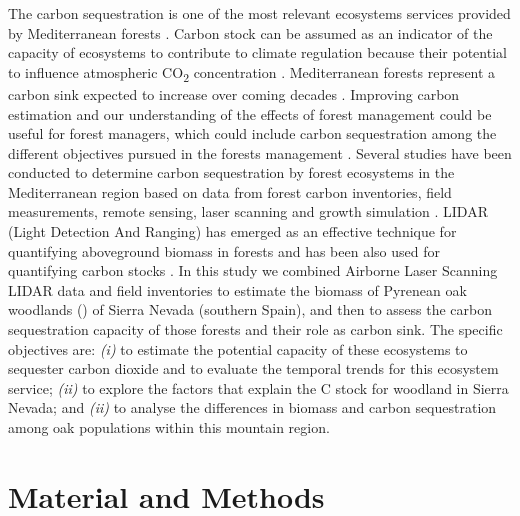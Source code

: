 The carbon sequestration is one of the most relevant ecosystems services provided by Mediterranean forests \autocite{Gauquelinetal2018MediterraneanForests,NoceSantini2018MediterraneanForest}. Carbon stock can be assumed as an indicator of the capacity of ecosystems to contribute to climate regulation because their potential to influence atmospheric CO\textsubscript{2} concentration \autocite{Lauterbach2007AssessmentExisting,Luyssaertetal2008OldgrowthForests}. Mediterranean forests represent a carbon sink expected to increase over coming decades \autocite{Canellasetal2017CarbonSequestration,PasalodosTatoetal2017EvaluationTree}. Improving carbon estimation and our understanding of the effects of forest management could be useful for forest managers, which could include carbon sequestration among the different objectives pursued in the forests management \autocite{RuizPeinadoetal2017ForestManagement}. Several studies have been conducted to determine carbon sequestration by forest ecosystems in the Mediterranean region based on data from forest carbon inventories, field measurements, remote sensing, laser scanning and growth simulation \autocites[\emph{e.g.}][]{Canellasetal2008SilvicultureCarbon,Chiesietal2005ModellingCarbon,Garciaetal2010EstimatingBiomass,GuerraHernandezetal2016ComparisonALS,Simonsonetal2016ModellingAboveground,Vayredaetal2012SpatialPatterns}. LIDAR (Light Detection And Ranging) has emerged as an effective technique for quantifying aboveground biomass in forests \autocite{Belandetal2019PromotingUse,Lefskyetal2002LidarRemote,Xiaoetal2019RemoteSensing} and has been also used for quantifying carbon stocks \autocite{Simonsonetal2016ModellingAboveground,Zhaoetal2018UtilityMultitemporal}. In this study we combined Airborne Laser Scanning LIDAR data and field inventories to estimate the biomass of Pyrenean oak woodlands (\Qp) of Sierra Nevada (southern Spain), and then to assess the carbon sequestration capacity of those forests and their role as carbon sink. The specific objectives are: \emph{(i)} to estimate the potential capacity of these ecosystems to sequester carbon dioxide and to evaluate the temporal trends for this ecosystem service; \emph{(ii)} to explore the factors that explain the C stock for \Qp woodland in Sierra Nevada; and \emph{(ii)} to analyse the differences in biomass and carbon sequestration among oak populations within this mountain region.  

\section{Material and Methods}\label{sec:carbon:mat}
